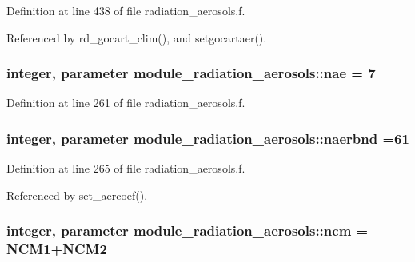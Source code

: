 Definition at line 438 of file radiation\+\_\+aerosols.\+f.



Referenced by rd\+\_\+gocart\+\_\+clim(), and setgocartaer().

\subsubsection[{\texorpdfstring{nae}{nae}}]{\setlength{\rightskip}{0pt plus 5cm}integer, parameter module\+\_\+radiation\+\_\+aerosols\+::nae = 7\hspace{0.3cm}{\ttfamily [private]}}\hypertarget{group__module__radiation__aerosols_ga45121ca4dcb3194e8afb4090fa810657}{}\label{group__module__radiation__aerosols_ga45121ca4dcb3194e8afb4090fa810657}


Definition at line 261 of file radiation\+\_\+aerosols.\+f.

\subsubsection[{\texorpdfstring{naerbnd}{naerbnd}}]{\setlength{\rightskip}{0pt plus 5cm}integer, parameter module\+\_\+radiation\+\_\+aerosols\+::naerbnd =61\hspace{0.3cm}{\ttfamily [private]}}\hypertarget{group__module__radiation__aerosols_gae8ffb66e7e617f045663ce2732743b4a}{}\label{group__module__radiation__aerosols_gae8ffb66e7e617f045663ce2732743b4a}


Definition at line 265 of file radiation\+\_\+aerosols.\+f.



Referenced by set\+\_\+aercoef().

\subsubsection[{\texorpdfstring{ncm}{ncm}}]{\setlength{\rightskip}{0pt plus 5cm}integer, parameter module\+\_\+radiation\+\_\+aerosols\+::ncm = N\+C\+M1+N\+C\+M2\hspace{0.3cm}{\ttfamily [private]}}\hypertarget{group__module__radiation__aerosols_gab46e61a4a386794a5e9e97d8ef7d98a5}{}\label{group__module__radiation__aerosols_gab46e61a4a386794a5e9e97d8ef7d98a5}


